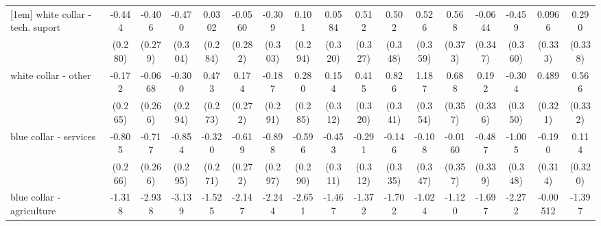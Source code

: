 {\begin{tabular}{l*{16}{c}}
[1em]
white collar - tech. suport&      -0.444         &      -0.406         &      -0.470         &      0.0302         &     -0.0560         &      -0.309         &       0.101         &      0.0584         &       0.512         &       0.502         &       0.526         &       0.568         &     -0.0644         &      -0.459         &      0.0966         &       0.290         \\
                    &     (0.280)         &     (0.279)         &     (0.304)         &     (0.284)         &     (0.282)         &     (0.303)         &     (0.294)         &     (0.320)         &     (0.327)         &     (0.348)         &     (0.359)         &     (0.373)         &     (0.347)         &     (0.360)         &     (0.333)         &     (0.338)         \\
[1em]
white collar - other&      -0.172         &     -0.0668         &      -0.300         &       0.473         &       0.174         &      -0.187         &       0.280         &       0.154         &       0.415         &       0.826\sym{*}  &       1.187\sym{***}&       0.688         &       0.192         &      -0.304         &       0.489         &       0.566         \\
                    &     (0.265)         &     (0.266)         &     (0.294)         &     (0.273)         &     (0.272)         &     (0.291)         &     (0.285)         &     (0.312)         &     (0.320)         &     (0.341)         &     (0.354)         &     (0.357)         &     (0.336)         &     (0.350)         &     (0.321)         &     (0.332)         \\
[1em]
blue collar - services&      -0.805\sym{**} &      -0.717\sym{**} &      -0.854\sym{**} &      -0.320         &      -0.619\sym{*}  &      -0.898\sym{**} &      -0.596\sym{*}  &      -0.453         &      -0.291         &      -0.146         &      -0.108         &     -0.0160         &      -0.487         &      -1.005\sym{**} &      -0.190         &       0.114         \\
                    &     (0.266)         &     (0.266)         &     (0.295)         &     (0.271)         &     (0.272)         &     (0.297)         &     (0.290)         &     (0.311)         &     (0.312)         &     (0.335)         &     (0.347)         &     (0.357)         &     (0.339)         &     (0.348)         &     (0.314)         &     (0.320)         \\
[1em]
blue collar - agriculture&      -1.318         &      -2.938\sym{***}&      -3.139\sym{**} &      -1.525         &      -2.147\sym{*}  &      -2.244\sym{**} &      -2.651\sym{**} &      -1.467         &      -1.372         &      -1.702\sym{*}  &      -1.024         &      -1.120         &      -1.697         &      -2.272\sym{**} &    -0.00512         &      -1.397         \\

\end{tabular}}
